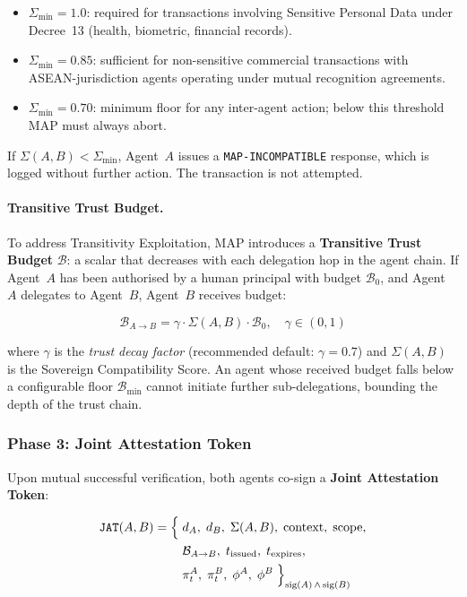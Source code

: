 \begin{itemize}
  \item $\Sigma_{\min} = 1.0$: required for transactions involving
        Sensitive Personal Data under Decree~13 (health, biometric,
        financial records).
  \item $\Sigma_{\min} = 0.85$: sufficient for non-sensitive commercial
        transactions with ASEAN-jurisdiction agents operating under
        mutual recognition agreements.
  \item $\Sigma_{\min} = 0.70$: minimum floor for any inter-agent
        action; below this threshold MAP must always abort.
\end{itemize}

If $\Sigma(A, B) < \Sigma_{\min}$, Agent~$A$ issues a
\texttt{MAP-INCOMPATIBLE} response, which is logged without further
action.  The transaction is not attempted.

\paragraph{Transitive Trust Budget.}

To address Transitivity Exploitation, MAP introduces a
\textbf{Transitive Trust Budget} $\mathcal{B}$: a scalar that decreases
with each delegation hop in the agent chain.  If Agent~$A$ has been
authorised by a human principal with budget $\mathcal{B}_0$, and Agent~$A$
delegates to Agent~$B$, Agent~$B$ receives budget:

\begin{equation}
\label{eq:transitive-budget}
\mathcal{B}_{A \to B} = \gamma \cdot \Sigma(A, B) \cdot \mathcal{B}_0,
\quad \gamma \in (0, 1)
\end{equation}

where $\gamma$ is the \emph{trust decay factor} (recommended default:
$\gamma = 0.7$) and $\Sigma(A, B)$ is the Sovereign Compatibility Score.
An agent whose received budget falls below a configurable floor
$\mathcal{B}_{\min}$ cannot initiate further sub-delegations, bounding
the depth of the trust chain.

\subsubsection*{Phase 3: Joint Attestation Token}

Upon mutual successful verification, both agents co-sign a
\textbf{Joint Attestation Token}:

\begin{align}
\label{eq:joint-attestation-token}
\mathtt{JAT}(A, B) = \Big\{
  &\; d_A,\; d_B,\;\Sigma(A,B),\; \text{context},\; \text{scope}, \notag \\
  &\; \mathcal{B}_{A \to B},\; t_{\text{issued}},\; t_{\text{expires}},\notag \\
  &\; \pi^A_t,\; \pi^B_t,\; \phi^A,\; \phi^B \;\Big\}_{\text{sig}(A) \,\wedge\, \text{sig}(B)}
\end{align}

